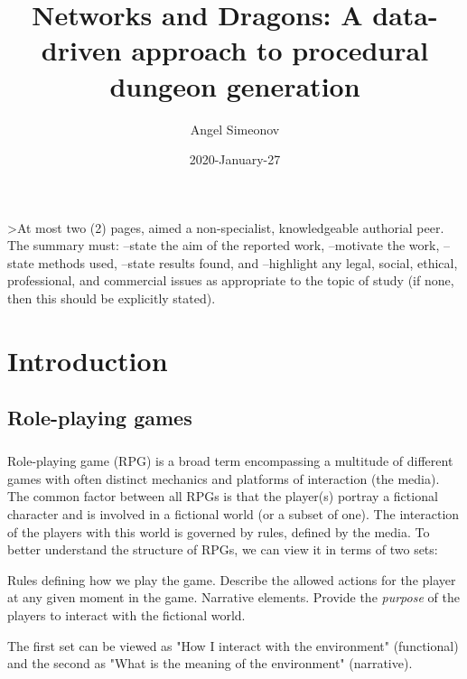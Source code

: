 \documentclass{UoYCSproject}
\author{Angel Simeonov}
\title{Networks and Dragons: A data-driven approach to procedural dungeon generation}
\date{2020-January-27}
\begin{document}
\maketitle
\listoffigures
\listoftables

\begin{summary}
>At most two (2) pages, aimed a non-specialist, knowledgeable authorial peer.
The summary must:
--state the aim of the reported work,
--motivate the work,
--state methods used,
--state results found, and
--highlight any legal, social, ethical, professional, and commercial issues as appropriate to the topic of study (if none, then this should be explicitly stated).
\end{summary}

\chapter{Introduction}
\label{cha:Introduction}

\section{Role-playing games}

\paragraph{}
Role-playing game (RPG) is a broad term encompassing a multitude of different games with often distinct mechanics and platforms of interaction (the media). The common factor between all RPGs is that the player(s) portray a fictional character and is involved in a fictional world (or a subset of one). The interaction of the players with this world is governed by rules, defined by the media. To better understand the structure of RPGs, we can view it in terms of two sets: 
\begin{outline}[enumerate]
  \1 Rules defining how we play the game. Describe the allowed actions for the player at any given moment in the game.
  \1 Narrative elements. Provide the \textit{purpose} of the players to interact with the fictional world. 
\end{outline}
The first set can be viewed as "How I interact with the environment" (functional) and the second as "What is the meaning of the environment" (narrative).
\end{document}
